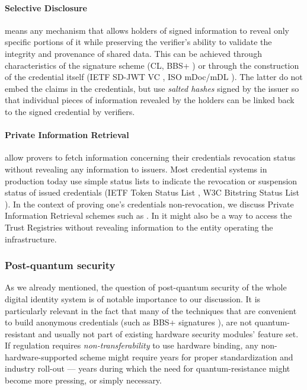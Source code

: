 \paragraph{Selective Disclosure} means any mechanism that allows holders of signed information to reveal only specific portions of it while preserving the verifier's ability to validate the integrity and provenance of shared data. This can be achieved through characteristics of the signature scheme (CL, BBS+ \cite{ASM06}) or through the construction of the credential itself (IETF SD-JWT VC \cite{SDJWT}, ISO mDoc/mDL \cite{ISO18013-5_2021}).
The latter do not embed the claims in the credentials, but use \emph{salted hashes} signed by the issuer so that individual pieces of information revealed by the holders can be linked back to the signed credential by verifiers.

\paragraph{Private Information Retrieval} allow provers to fetch information concerning their credentials revocation status without revealing any information to issuers. 
Most credential systems in production today use simple status lists to indicate the revocation or suspension status of issued credentials (IETF Token Status List \cite{TSL}, W3C Bitstring Status List \cite{W3C-status-lists}).
In the context of proving one's credentials non-revocation, we discuss Private Information Retrieval schemes such as \cite{MW22}.
In \swiyu \cite{Swiyu} it might also be a way to access the Trust Registries without revealing information to the entity operating the infrastructure.

\subsubsection{Post-quantum security}

As we already mentioned, the question of post-quantum security of the whole digital identity system is of notable importance to our discussion.
It is particularly relevant in the fact that many of the techniques that are convenient to build anonymous credentials (such as BBS+ signatures \cite{ASM06}), are not quantum-resistant and usually not part of existing hardware security modules' feature set. If regulation requires \emph{non-transferability} to use hardware binding, any non-hardware-supported scheme might require years for proper standardization and industry roll-out --- years during which the need for quantum-resistance might become more pressing, or simply necessary.
